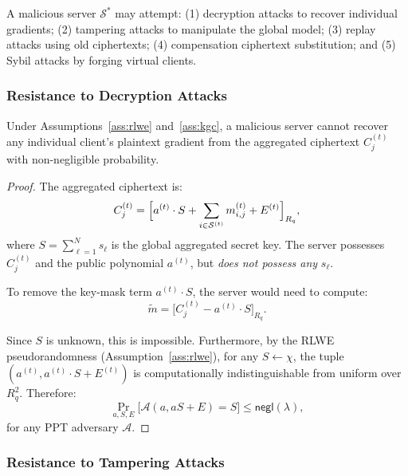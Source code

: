 A malicious server $\mathcal{S}^*$ may attempt: (1) decryption attacks to recover individual gradients; (2) tampering attacks to manipulate the global model; (3) replay attacks using old ciphertexts; (4) compensation ciphertext substitution; and (5) Sybil attacks by forging virtual clients.

\subsubsection{Resistance to Decryption Attacks}

\begin{theorem}
\label{thm:server-decrypt}
Under Assumptions~\ref{ass:rlwe} and~\ref{ass:kgc}, a malicious server cannot recover any individual client's plaintext gradient from the aggregated ciphertext $C_j^{(t)}$ with non-negligible probability.
\end{theorem}

\begin{proof}
The aggregated ciphertext is:
\begin{equation}
    C_j^{(t)} = \Bigl[ a^{(t)} \cdot S + \sum_{i \in \mathcal{S}^{(t)}} m_{i,j}^{(t)} + E^{(t)} \Bigr]_{R_q},
\end{equation}
where $S = \sum_{\ell=1}^{N} s_\ell$ is the global aggregated secret key. The server possesses $C_j^{(t)}$ and the public polynomial $a^{(t)}$, but \emph{does not possess any} $s_\ell$.

To remove the key-mask term $a^{(t)} \cdot S$, the server would need to compute:
\begin{equation}
    \tilde{m} = \bigl[ C_j^{(t)} - a^{(t)} \cdot S \bigr]_{R_q}.
\end{equation}

Since $S$ is unknown, this is impossible. Furthermore, by the RLWE pseudorandomness (Assumption~\ref{ass:rlwe}), for any $S \gets \chi$, the tuple $(a^{(t)}, a^{(t)} \cdot S + E^{(t)})$ is computationally indistinguishable from uniform over $R_q^2$. Therefore:
\begin{equation}
    \Pr_{a,S,E}\bigl[\mathcal{A}(a, aS+E) = S\bigr] \leq \mathsf{negl}(\lambda),
\end{equation}
for any PPT adversary $\mathcal{A}$.
\end{proof}

\subsubsection{Resistance to Tampering Attacks}

